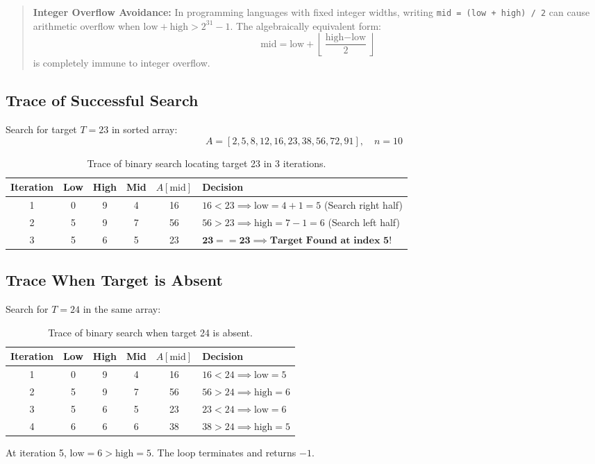 \begin{quote}
\textbf{Integer Overflow Avoidance:} In programming languages with fixed integer widths, writing \texttt{mid = (low + high) / 2} can cause arithmetic overflow when $\text{low} + \text{high} > 2^{31}-1$. The algebraically equivalent form:
\[
\boxed{\text{mid} = \text{low} + \left\lfloor \frac{\text{high} - \text{low}}{2} \right\rfloor}
\]
is completely immune to integer overflow.
\end{quote}

\subsection{Trace of Successful Search}
Search for target $T = 23$ in sorted array:
\[
A = [2, 5, 8, 12, 16, 23, 38, 56, 72, 91], \quad n = 10
\]

\begin{table}[htbp]
\centering
\small
\begin{tabular}{c c c c c l}
\toprule
\textbf{Iteration} & \textbf{Low} & \textbf{High} & \textbf{Mid} & \textbf{$A[\text{mid}]$} & \textbf{Decision} \\
\midrule
1 & 0 & 9 & 4 & 16 & $16 < 23 \implies \text{low} = 4 + 1 = 5$ (Search right half) \\
2 & 5 & 9 & 7 & 56 & $56 > 23 \implies \text{high} = 7 - 1 = 6$ (Search left half) \\
3 & 5 & 6 & 5 & 23 & $\mathbf{23 == 23 \implies \text{Target Found at index 5!}}$ \\
\bottomrule
\end{tabular}
\caption{Trace of binary search locating target 23 in 3 iterations.}
\end{table}

\subsection{Trace When Target is Absent}
Search for $T = 24$ in the same array:
\begin{table}[htbp]
\centering
\small
\begin{tabular}{c c c c c l}
\toprule
\textbf{Iteration} & \textbf{Low} & \textbf{High} & \textbf{Mid} & \textbf{$A[\text{mid}]$} & \textbf{Decision} \\
\midrule
1 & 0 & 9 & 4 & 16 & $16 < 24 \implies \text{low} = 5$ \\
2 & 5 & 9 & 7 & 56 & $56 > 24 \implies \text{high} = 6$ \\
3 & 5 & 6 & 5 & 23 & $23 < 24 \implies \text{low} = 6$ \\
4 & 6 & 6 & 6 & 38 & $38 > 24 \implies \text{high} = 5$ \\
\bottomrule
\end{tabular}
\caption{Trace of binary search when target 24 is absent.}
\end{table}
At iteration 5, $\text{low} = 6 > \text{high} = 5$. The loop terminates and returns $-1$.

